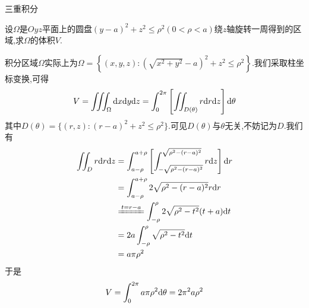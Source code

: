 \documentclass{ctexart}
\begin{document}
\pagestyle{empty}
\begin{center}\large 三重积分\end{center}
\begin{problem}[1.]
    设$\Omega$是$Oyz$平面上的圆盘$(y-a)^2+z^2\leqslant\rho^2\left(0<\rho<a\right)$绕$z$轴旋转一周得到的区域,求$\Omega$的体积$V$.
\end{problem}
\begin{solution}
    积分区域$\Omega$实际上为$\Omega=\left\{(x,y,z):\left(\sqrt{x^2+y^2}-a\right)^2+z^2\leqslant\rho^2\right\}$.我们采取柱坐标变换,可得
    \[V=\iiint_{\Omega}\mathrm{d} x\mathrm{d} y\mathrm{d} z=\int_{0}^{2\pi}\left[\iint_{D(\theta)}r\mathrm{d} r\mathrm{d} z\right]\mathrm{d}\theta\]
    其中$D(\theta)=\{(r,z):(r-a)^2+z^2\leqslant\rho^2\}$.可见$D(\theta)$与$\theta$无关,不妨记为$D$.我们有
    \[\begin{aligned}
        \iint_{D}r\di r\di z
        &= \int_{a-\rho}^{a+\rho}\left[\int_{-\sqrt{\rho^2-(r-a)^2}}^{\sqrt{\rho^2-(r-a)^2}}r\di z\right]\di r \\
        &= \int_{a-\rho}^{a+\rho}2\sqrt{\rho^2-(r-a)^2}r\di r \\
        &\xlongequal{t=r-a} \int_{-\rho}^{\rho}2\sqrt{\rho^2-t^2}(t+a)\di t \\
        &= 2a\int_{-\rho}^{\rho}\sqrt{\rho^2-t^2}\di t \\
        &= a\pi\rho^2
    \end{aligned}\]
    于是
    \[V=\int_{0}^{2\pi}a\pi\rho^2\mathrm{d}\theta=2\pi^2a\rho^2\]
\end{solution}
\end{document}
